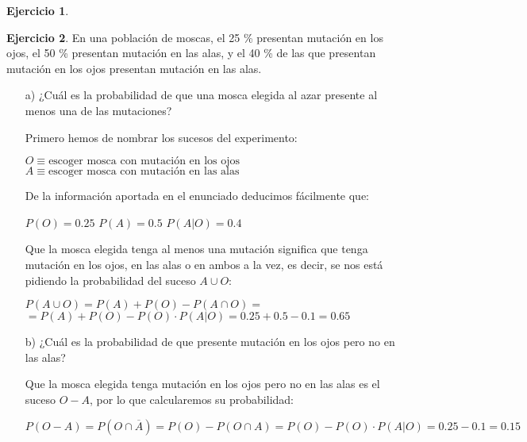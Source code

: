 \documentclass[a4paper, 12pt]{article}
\theoremstyle{definition}
\newtheorem{ej}{Ejercicio}
\begin{document}
\newpage

\begin{ej}
\end{ej}

\begin{ej}
En una población de moscas, el 25 \% presentan mutación en los ojos, el 50 \% presentan mutación
en las alas, y el 40 \% de las que presentan mutación en los ojos presentan mutación en las alas.

\begin{enumerate}

\item[a)] ¿Cuál es la probabilidad de que una mosca elegida al azar presente al menos una de las
mutaciones?

Primero hemos de nombrar los sucesos del experimento:

\begin{center}
    $O \equiv \text{escoger mosca con mutación en los ojos}$
    $A \equiv \text{escoger mosca con mutación en las alas}$
\end{center}

De la información aportada en el enunciado deducimos fácilmente que:

\begin{center}
    $P(O) = 0.25$ \hspace{1cm} $P(A) = 0.5$ \hspace{1cm} $P(A|O) = 0.4$
\end{center}

Que la mosca elegida tenga al menos una mutación  significa que tenga mutación en los ojos, en las alas o en ambos a la vez, es decir, se nos está pidiendo la probabilidad del suceso $A\cup O$:

\begin{center}
    $P(A\cup O) = P(A) + P(O) - P(A\cap O) =$
    $= P(A) + P(O) - P(O)\cdot P(A|O) = 0.25 + 0.5 - 0.1 = 0.65$
\end{center}

\item[b)] ¿Cuál es la probabilidad de que presente mutación en los ojos pero no en las alas?

Que la mosca elegida tenga mutación en los ojos pero no en las alas es el suceso $O-A$, por lo que calcularemos su probabilidad:

\begin{center}
    $P(O-A) = P(O\cap \overline{A}) = P(O) - P(O\cap A) = P(O) - P(O)\cdot P(A|O) = 0.25 - 0.1 = 0.15$
\end{center}
\end{enumerate}
\end{ej}
\end{document}
